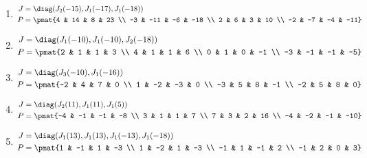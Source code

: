 \begin{enumerate}
\item

\begin{align*}
J &= \diag(J_{2}(-15), J_{1}(-17), J_{1}(-18))\\
P &= \pmat{4 & 14 & 8 & 23 \\ -3 & -11 & -6 & -18 \\ 2 & 6 & 3 & 10 \\ -2 & -7 & -4 & -11}
\end{align*}

\item

\begin{align*}
J &= \diag(J_{1}(-10), J_{1}(-10), J_{2}(-18))\\
P &= \pmat{2 & 1 & 1 & 3 \\ 4 & 1 & 1 & 6 \\ 0 & 1 & 0 & -1 \\ -3 & -1 & -1 & -5}
\end{align*}

\item

\begin{align*}
J &= \diag(J_{3}(-10), J_{1}(-16))\\
P &= \pmat{-2 & 4 & 7 & 0 \\ 1 & -2 & -3 & 0 \\ -3 & 5 & 8 & -1 \\ -2 & 5 & 8 & 0}
\end{align*}

\item

\begin{align*}
J &= \diag(J_{2}(11), J_{1}(11), J_{1}(5))\\
P &= \pmat{-4 & -1 & -1 & -8 \\ 3 & 1 & 1 & 7 \\ 7 & 3 & 2 & 16 \\ -4 & -2 & -1 & -10}
\end{align*}

\item

\begin{align*}
J &= \diag(J_{1}(13), J_{1}(13), J_{1}(-13), J_{1}(-18))\\
P &= \pmat{1 & -1 & 1 & -3 \\ 1 & -2 & 1 & -3 \\ -1 & 1 & -1 & 2 \\ -1 & 2 & 0 & 3}
\end{align*}


\end{enumerate}
